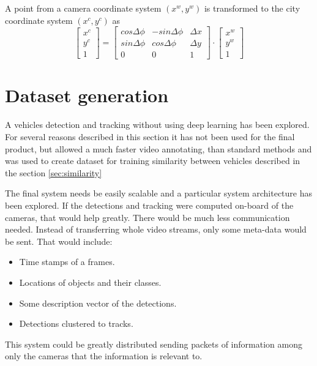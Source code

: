\documentclass[a4paper,12pt,titlepage]{article}
\numberwithin{figure}{section}
\begin{document}
A point from a camera coordinate system $(x^w, y^w)$ is transformed to the city coordinate system $(x^c, y^c)$ as
\[
  \begin{bmatrix}
    x^c \\
    y^c \\
    1
  \end{bmatrix}
   = 
  \begin{bmatrix}
    cos\Delta\phi & -sin\Delta\phi & \Delta x\\
    sin\Delta\phi & cos\Delta\phi & \Delta y\\
    0 & 0 & 1
  \end{bmatrix}   
  \cdot 
  \begin{bmatrix}
    x^w \\
    y^w \\
    1
  \end{bmatrix}
\]








\section{Dataset generation}
\label{sec:classical}

A vehicles detection and tracking without using deep learning has been explored. For several reasons described in this section it has not been used for the final product, but allowed a much faster video annotating, than standard methods and was used to create dataset for training similarity between vehicles described in the section \ref{sec:similarity}

The final system needs be easily scalable and a particular system architecture has been explored. If the detections and tracking were computed on-board of the cameras, that would help greatly. There would be much less communication needed. Instead of transferring whole video streams, only some meta-data would be sent. That would include: 

\begin{itemize}
\item Time stamps of a frames.
\item Locations of objects and their classes.
\item Some description vector of the detections.
\item Detections clustered to tracks.
\end{itemize}

This system could be greatly distributed sending packets of information among only the cameras that the information is relevant to.
\end{document}
